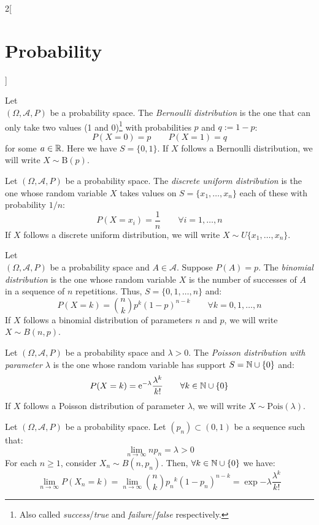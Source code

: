 \documentclass[../../../main.tex]{subfiles}
\begin{document}
\begin{multicols}{2}[\section{Probability}]
\begin{definition}
  \end{definition}
  \begin{definition}
    Let\\ $(\Omega,\mathcal{A},P)$ be a probability space. The \textit{Bernoulli distribution} is the one that can only take two values (1 and 0)\footnote{Also called \textit{success}/\textit{true} and \textit{failure}/\textit{false} respectively.} with probabilities $p$ and $q:=1-p$: $$P(X=0)=p\qquad P(X=1)=q$$ for some $a\in\mathbb{R}$. Here we have $S=\{0,1\}$. If $X$ follows a Bernoulli distribution, we will write $X\sim \text{B}(p)$.
  \end{definition}
  \begin{definition}
    Let $(\Omega,\mathcal{A},P)$ be a probability space. The \textit{discrete uniform distribution} is the one whose random variable $X$ takes values on $S=\{x_1,\ldots,x_n\}$ each of these with probability $1/n$: $$P(X=x_i)=\frac{1}{n}\qquad \forall i=1,\ldots,n$$ If $X$ follows a discrete uniform distribution, we will write $X\sim U\{x_1,\ldots,x_n\}$.
  \end{definition}
  \begin{definition}
    Let\\ $(\Omega,\mathcal{A},P)$ be a probability space and $A\in\mathcal{A}$. Suppose $P(A)=p$. The \textit{binomial distribution} is the one whose random variable $X$ is the number of successes of $A$ in a sequence of $n$ repetitions. Thus, $S=\{0,1,\ldots,n\}$ and: $$P(X=k)=\binom{n}{k}p^k{(1-p)}^{n-k}\qquad \forall k=0,1,\ldots,n$$ If $X$ follows a binomial distribution of parameters $n$ and $p$, we will write $X\sim B(n,p)$.
  \end{definition}
  \begin{definition}
    Let $(\Omega,\mathcal{A},P)$ be a probability space and $\lambda>0$. The \textit{Poisson distribution with parameter $\lambda$} is the one whose random variable has support $S=\mathbb{N}\cup\{0\}$ and: $$P(X=k)=\mathrm{e}^{-\lambda}\frac{\lambda^k}{k!}\qquad \forall k\in\mathbb{N}\cup\{0\}$$ If $X$ follows a Poisson distribution of parameter $\lambda$, we will write $X\sim \text{Pois}(\lambda)$.
  \end{definition}
  \begin{theorem}
    Let $(\Omega,\mathcal{A},P)$ be a probability space. Let $(p_n)\subset(0,1)$ be a sequence such that: $$\lim_{n\to\infty}np_n=\lambda>0$$
    For each $n\geq 1$, consider $X_n\sim B(n,p_n)$. Then, $\forall k\in\mathbb{N}\cup\{0\}$ we have: $$\lim_{n\to\infty}P(X_n=k)=\lim_{n\to\infty}\binom{n}{k}{p_n}^k{(1-p_n)}^{n-k}=\exp{-\lambda}\frac{\lambda^k}{k!}$$

\end{theorem}
\end{multicols}
\end{document}
